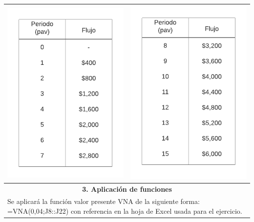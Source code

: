 \begin{center}
\begin{longtable}[H]{|p{0.5\linewidth}|p{0.5\linewidth}|}
  \multicolumn{1}{|c|}{\includegraphics[trim=-5 -5 -5 -5 ,width=0.5\columnwidth]{11/Tabla 1.pdf}} & \multicolumn{1}{|c|}{ \includegraphics[trim=-5 -5 -5 -5 ,width=0.5\columnwidth]{11/Tabla 2.pdf}} \\ \hline
  \multicolumn{2}{|c|}{\cellcolor[HTML]{FFB183}\textbf{3. Aplicación de funciones}}                                                                                                                  \\ \hline
  \multicolumn{2}{|p{\columnwidth}|}{Se aplicará la función valor presente VNA de la siguiente forma: \newline
  =VNA(0,04;J8::J22) con referencia en la hoja de
  Excel usada para el ejercicio.}                                                                                                                                                                    \\

\end{longtable}
\end{center}
